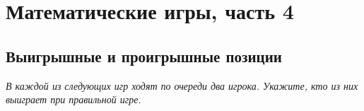 

\section*{Математические игры, часть 4}



\subsection*{Выигрышные и проигрышные позиции}

\emph{%
В каждой из следующих игр ходят по очереди два игрока.
Укажите, кто из них выиграет при правильной игре.}

